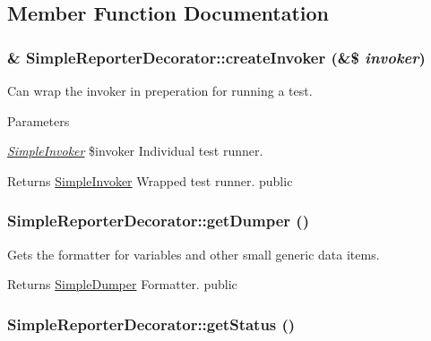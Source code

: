 \subsection{Member Function Documentation}
\hypertarget{class_simple_reporter_decorator_a9c002b61072edecc11603dfb41bb00a5}{
\subsubsection[{createInvoker}]{\setlength{\rightskip}{0pt plus 5cm}\& SimpleReporterDecorator::createInvoker (\&\$ {\em invoker})}}
\label{class_simple_reporter_decorator_a9c002b61072edecc11603dfb41bb00a5}
Can wrap the invoker in preperation for running a test. 
\begin{DoxyParams}{Parameters}
\item[{\em \hyperlink{class_simple_invoker}{SimpleInvoker}}]\$invoker Individual test runner. \end{DoxyParams}
\begin{DoxyReturn}{Returns}
\hyperlink{class_simple_invoker}{SimpleInvoker} Wrapped test runner.  public 
\end{DoxyReturn}
\hypertarget{class_simple_reporter_decorator_ae6ed25f3a3cda7aab6a71ddc77b00695}{
\subsubsection[{getDumper}]{\setlength{\rightskip}{0pt plus 5cm}SimpleReporterDecorator::getDumper ()}}
\label{class_simple_reporter_decorator_ae6ed25f3a3cda7aab6a71ddc77b00695}
Gets the formatter for variables and other small generic data items. \begin{DoxyReturn}{Returns}
\hyperlink{class_simple_dumper}{SimpleDumper} Formatter.  public 
\end{DoxyReturn}
\hypertarget{class_simple_reporter_decorator_a5270362707f6df0d37eb9f4b9d4ec339}{
\subsubsection[{getStatus}]{\setlength{\rightskip}{0pt plus 5cm}SimpleReporterDecorator::getStatus ()}}
